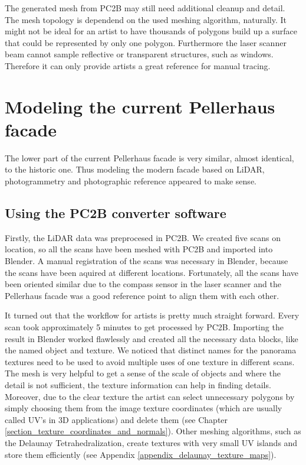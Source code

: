 The generated mesh from PC2B may still need additional cleanup and detail. The mesh topology is dependend on the used meshing algorithm, naturally. It might not be ideal for an artist to have thousands of polygons build up a surface that could be represented by only one polygon. Furthermore the laser scanner beam cannot sample reflective or transparent structures, such as windows. Therefore it can only provide artists a great reference for manual tracing.

\section{Modeling the current Pellerhaus facade}

The lower part of the current Pellerhaus facade is very similar, almost identical, to the historic one. Thus modeling the modern facade based on LiDAR, photogrammetry and photographic reference appeared to make sense.

\subsection{Using the PC2B converter software}

Firstly, the LiDAR data was preprocesed in PC2B. We created five scans on location, so all the scans have been meshed with PC2B and imported into Blender. A manual registration of the scans was necessary in Blender, because the scans have been aquired at different locations. Fortunately, all the scans have been oriented similar due to the compass sensor in the laser scanner and the Pellerhaus facade was a good reference point to align them with each other.


It turned out that the workflow for artists is pretty much straight forward. Every scan took approximately 5 minutes to get processed by PC2B. Importing the result in Blender worked flawlessly and created all the necessary data blocks, like the named object and texture. We noticed that distinct names for the panorama textures need to be used to avoid multiple uses of one texture in different scans. The mesh is very helpful to get a sense of the scale of objects and where the detail is not sufficient, the texture information can help in finding details. Moreover, due to the clear texture the artist can select unnecessary polygons by simply choosing them from the image texture coordinates (which are usually called UV's in 3D applications) and delete them (see Chapter \ref{section_texture_coordinates_and_normals}). Other meshing algorithms, such as the Delaunay Tetrahedralization, create textures with very small UV islands and store them efficiently (see Appendix \ref{appendix_delaunay_texture_maps}).

